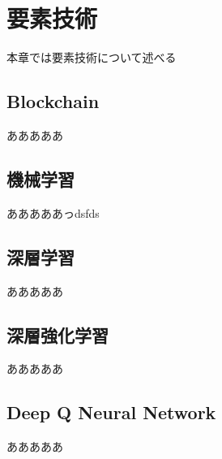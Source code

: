 \chapter{要素技術}
\label{technical_background}

本章では要素技術について述べる

\section{Blockchain}

あああああ

\section{機械学習}

あああああっdsfds

\section{深層学習}

あああああ

\section{深層強化学習}

あああああ

\section{Deep Q Neural Network}

あああああ




